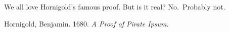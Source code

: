 We all love Hornigold's famous proof. But is it real? No.~Probably not.

\label{refs}
\begin{CSLReferences}{1}{0}
Hornigold, Benjamin. 1680. \emph{A Proof of Pirate Ipsum}.

\end{CSLReferences}
